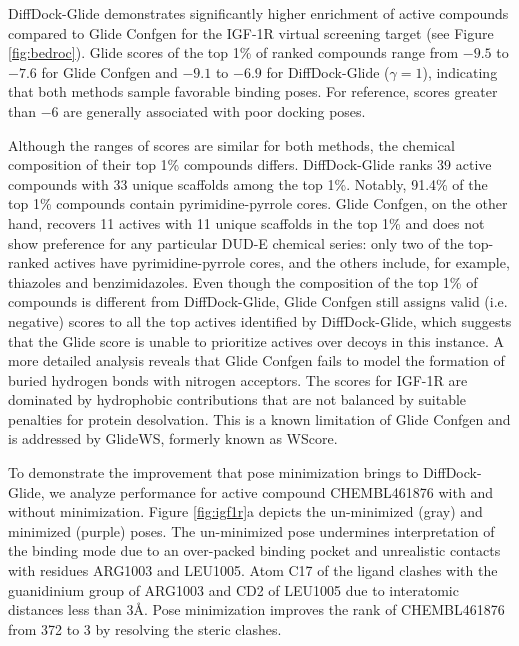 \documentclass[letterpaper]{article}
\newcommand{\lh}[1]{{\color{blue}{#1}}}
\begin{document}
DiffDock-Glide demonstrates significantly higher enrichment of active compounds compared to Glide Confgen for the IGF-1R virtual screening target (see Figure \ref{fig:bedroc}). Glide scores of the top 1\% of ranked compounds range from $-9.5$ to $-7.6$ for Glide Confgen and $-9.1$ to $-6.9$ for DiffDock-Glide ($\gamma=1$), indicating that both methods sample favorable binding poses. For reference, scores greater than $-6$ are generally associated with poor docking poses.\cite{friesner2004glide}

Although the ranges of scores are similar for both methods, the chemical composition of their top 1\% compounds differs.
DiffDock-Glide ranks 39 active compounds with 33 unique scaffolds among the top 1\%. Notably, 91.4\% of the top 1\% compounds contain pyrimidine-pyrrole cores. Glide Confgen, on the other hand, recovers 11 actives with 11 unique scaffolds in the top 1\% and does not show preference for any particular DUD-E chemical series: only two of the top-ranked actives have pyrimidine-pyrrole cores, and the others include, for example, thiazoles and benzimidazoles. Even though the composition of the top 1\% of compounds is different from DiffDock-Glide, Glide Confgen still assigns valid (i.e. negative) scores to all the top actives identified by DiffDock-Glide, which suggests that the Glide score is unable to prioritize actives over decoys in this instance. A more detailed analysis reveals that Glide Confgen fails to model the formation of buried hydrogen bonds with nitrogen acceptors. The scores for IGF-1R are dominated by hydrophobic contributions that are not balanced by suitable penalties for protein desolvation. This is a known limitation of Glide Confgen and is addressed by GlideWS, formerly known as WScore.\cite{murphy2016wscore}

To demonstrate the improvement that pose minimization brings to DiffDock-Glide, we analyze performance for active compound CHEMBL461876 with and without minimization. Figure \ref{fig:igf1r}a depicts the un-minimized (gray) and minimized (purple) poses. The un-minimized pose undermines interpretation of the binding mode due to an over-packed binding pocket and unrealistic contacts with residues ARG1003 and LEU1005. Atom C17 of the ligand clashes with the guanidinium group of ARG1003 and CD2 of LEU1005 due to interatomic distances less than 3{\AA}. Pose minimization improves the rank of CHEMBL461876 from 372 to 3 by resolving the steric clashes. \lh{It is worth noting that the reference complex for IGF-1R is present in DiffDock's training set, and performance is expected to decrease for dissimilar to the training set.}
\end{document}
